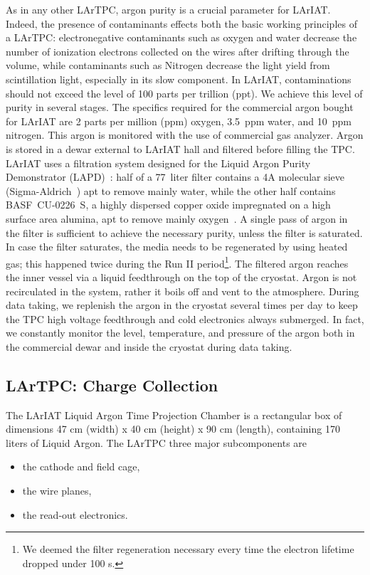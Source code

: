 As in any other LArTPC, argon purity is a crucial parameter for LArIAT. Indeed, the presence of contaminants effects both the basic working principles of a LArTPC: electronegative contaminants such as oxygen and water decrease the number of ionization electrons collected on the wires after drifting through the volume, while contaminants such as Nitrogen decrease the light yield from scintillation light, especially in its slow component.
In LArIAT, contaminations should not exceed the level of 100 parts per trillion (ppt). We achieve this level of purity in several stages. The specifics required for the commercial argon bought for LArIAT are 2 parts per million (ppm) oxygen, 3.5~ppm water, and 10~ppm nitrogen. This argon is monitored with the use of commercial gas analyzer.
Argon is stored in a dewar external to LArIAT hall and filtered before filling the TPC. %
LArIAT uses a filtration system designed for the Liquid Argon Purity Demonstrator (LAPD)~\cite{LAPD}: half of a 77~liter filter contains a 4A molecular sieve (Sigma-Aldrich~\cite{sigma-aldrich}) apt to remove mainly water, while the other half contains BASF~CU-0226~S, a highly dispersed copper oxide impregnated on a high surface area alumina, apt to remove mainly oxygen~\cite{basf}. A single pass of argon in the filter is sufficient to achieve the necessary purity, unless the filter is saturated. In case the filter saturates, the media needs to be regenerated by using heated gas; this happened twice during the Run II period\footnote{We deemed the filter regeneration necessary every time the electron lifetime dropped under 100 \textmu s.}.
The filtered argon reaches the inner vessel via a liquid feedthrough on the top of the cryostat. Argon is not recirculated in the system, rather it boils off and vent to the atmosphere. During data taking, we replenish the argon in the cryostat several times per day to keep the TPC high voltage feedthrough and cold electronics always submerged. In fact, we constantly monitor the level, temperature, and pressure of the argon both in the commercial dewar and inside the cryostat during data taking. 
\subsection{LArTPC: Charge Collection}\label{sec:TPCCharge}
The LArIAT Liquid Argon Time Projection Chamber is a rectangular box of dimensions 47 cm (width) x 40 cm (height) x 90 cm (length), containing 170 liters of Liquid Argon.
The LArTPC three major subcomponents are 
\begin{itemize} 
\item[1)] the cathode and field cage,
\item [2)] the wire planes, 
\item [3)] the read-out electronics. %
\end{itemize}



